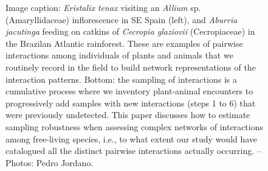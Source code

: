 \documentclass[a4paper,12pt]{article}
\begin{document}
\begin{figure}
  \caption{Image caption: \textit{Eristalix tenax} visiting an \textit{Allium} sp. (Amaryllidaceae) inflorescence in SE Spain (left), and \textit{Aburria jacutinga} feeding on catkins of \textit{Cecropia glaziovii} (Cecropiaceae) in the Brazilan Atlantic rainforest. These are examples of pairwise interactions among individuals of plants and animals that we routinely record in the field to build network representations of the interaction patterns. Bottom: the sampling of interactions is a cumulative process where we inventory plant-animal encounters to progressively add samples with new interactions (steps 1 to 6) that were previously undetected. This paper discusses how to estimate sampling robustness when assessing complex networks of interactions among free-living species, i.e., to what extent our study would have catalogued all the distinct pairwise interactions actually occurring. – Photos: Pedro Jordano.}
  \label{Fig_laysumm}
\end{figure}
\end{document}
